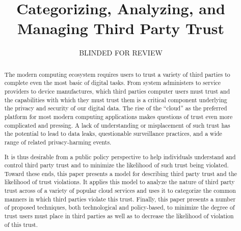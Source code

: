 \documentclass[11pt,letterpaper]{article}
\begin{document}
\title{Categorizing, Analyzing, and Managing Third Party Trust}

\author{BLINDED FOR REVIEW}

\date{}

\maketitle

\begin{abstract}

The modern computing ecosystem requires users to trust a variety of
third parties to complete even the most basic of digital tasks.  From
system administers to service providers to device manufactures, which
third parties computer users must trust and the capabilities with
which they must trust them is a critical component underlying the
privacy and security of our digital data. The rise of the ``cloud'' as
the preferred platform for most modern computing applications makes
questions of trust even more complicated and pressing. A lack of
understanding or misplacement of such trust has the potential to lead
to data leaks, questionable surveillance practices, and a wide range
of related privacy-harming events.

It is thus desirable from a public policy perspective to help
individuals understand and control third party trust and to minimize
the likelihood of such trust being violated. Toward these ends, this
paper presents a model for describing third party trust and the
likelihood of trust violations. It applies this model to analyze the
nature of third party trust across of a variety of popular cloud
services and uses it to categorize the common manners in which third
parties violate this trust. Finally, this paper presents a number of
proposed techniques, both technological and policy-based, to minimize
the degree of trust users must place in third parties as well as to
decrease the likelihood of violation of this trust.

\end{abstract}









\end{document}
